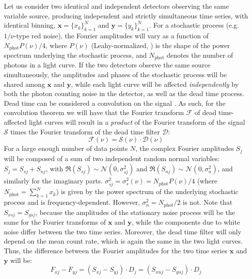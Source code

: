 \documentclass[twocolumn]{aastex61}
\newcommand{\Normal}{\ensuremath{{\mathcal N}}\xspace}
\begin{document}
Let us consider two identical and independent detectors observing the same variable source, producing independent and strictly simultaneous time series, with identical binning, $\mathbf{x} = \{x_k\}_{k=1}^N$ and $\mathbf{y} = \{y_k\}_{k=1}^N$. For a stochastic process (e.g.\ $1/\nu$-type red noise), the Fourier amplitudes will vary as a function of $N_{\mathrm{phot}}P(\nu)/4$, where $P(\nu)$ (Leahy-normalized, \citealt{Leahy+83}) is the shape of the power spectrum underlying the stochastic process, and $N_{\mathrm{phot}}$ denotes the number of photons in a light curve. If the two detectors observe the same source simultaneously, the amplitudes and phases of the stochastic process will be shared among $\mathbf{x}$ and $\mathbf{y}$, while each light curve will be affected \textit{independently} by both the photon counting noise in the detector, as well as the dead time process. 
Dead time can be considered a convolution on the signal \citep{Vikhlinin+94}. 
As such, for the convolution theorem we will have that the Fourier transform $\mathcal{F}$ of dead time-affected light curves will result in a \textit{product} of the Fourier transform of the signal $\mathcal{S}$ times the Fourier transform of the dead time filter $\mathcal{D}$:
\begin{equation}
\mathcal{F}(\nu) = \mathcal{S}(\nu)\cdot\mathcal{D}(\nu)
\end{equation}
For a large enough number of data points $N$, the complex Fourier amplitudes $S_j$ will be composed of a sum of two independent random normal variables: $S_j = S_{sj} + S_{nj}$, with $\Re (S_{sj}) \sim \Normal(0, \sigma_{sj}^2)$ and $\Re(S_{nj}) \sim \Normal(0, \sigma_n^2)$, and similarly for the imaginary parts.
$\sigma_{sj}^2 = \sigma_{s}^2(\nu) = N_\mathrm{phot}P(\nu)/4$ (where $N_{\mathrm{phot}} = \sum_{k=1}^{N}{x_k}$) is given by the power spectrum of the underlying stochastic process and is frequency-dependent. However, $\sigma_n^2 = N_\mathrm{phot}/2$ is not. 
Note that $S_{xsj} = S_{ysj}$, because the amplitudes of the stationary noise process will be the same for the Fourier transforms of $\mathbf{x}$ and $\mathbf{y}$, while the components due to white noise differ between the two time series.
Moreover, the dead time filter will only depend on the mean count rate, which is again the same in the two light curves.
Thus, the difference between the Fourier amplitudes for the two time series $\mathbf{x}$ and $\mathbf{y}$ will be:
\begin{equation}
F_{xj} - F_{yj} = (S_{xj} - S_{yj})\cdot D_j = (S_{xnj} - S_{ynj})\cdot D_j
\end{equation}
\end{document}
